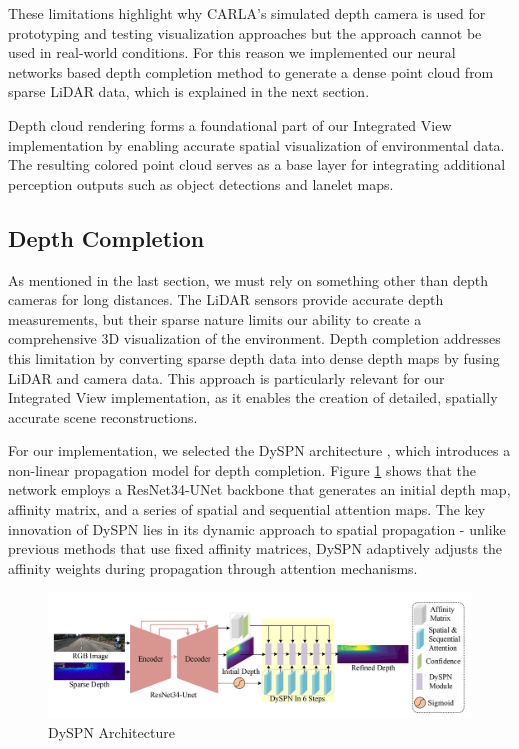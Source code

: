 These limitations highlight why CARLA's simulated depth camera is used for prototyping and testing visualization approaches but the approach cannot be used in real-world conditions.
For this reason we implemented our neural networks based depth completion method to generate a dense point cloud from sparse LiDAR data, which is explained in the next section.

Depth cloud rendering forms a foundational part of our Integrated View implementation by enabling accurate spatial visualization of environmental data. The resulting colored point cloud serves as a base layer for integrating additional perception outputs such as object detections and lanelet maps.
\subsection{Depth Completion}
As mentioned in the last section, we must rely on something other than depth cameras for long distances. The \ac{LiDAR} sensors provide accurate depth measurements, but their sparse nature limits our ability to create a comprehensive 3D visualization of the environment.
Depth completion addresses this limitation by converting sparse depth data into dense depth maps by fusing \ac{LiDAR} and camera data. This approach is particularly relevant for our Integrated View implementation, as it enables the creation of detailed, spatially accurate scene reconstructions.

For our implementation, we selected the \ac{DySPN} architecture \cite{dyspn}, which introduces a non-linear propagation model for depth completion. Figure \ref{fig:dyspn_architecture} shows that the network employs a ResNet34-UNet backbone that generates an initial depth map, affinity matrix, and a series of spatial and sequential attention maps. The key innovation of \ac{DySPN} lies in its dynamic approach to spatial propagation - unlike previous methods \cite{cheng2020cspn} that use fixed affinity matrices, \ac{DySPN} adaptively adjusts the affinity weights during propagation through attention mechanisms.

\begin{figure}
    \centering
    \includegraphics[width=\textwidth]{figures/dyspn.png}
    \caption{\ac{DySPN} Architecture \cite{dyspn}}
    \label{fig:dyspn_architecture}
\end{figure}

